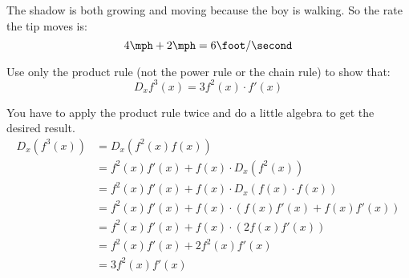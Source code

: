 \documentclass[fleqn,addpoints]{exam}
\begin{document}
\begin{questions}
\begin{solution}[9 cm]
The shadow is both growing and moving because the boy is walking.  So the rate the tip moves is:
\[
  4 \mph + 2 \mph = 6 \foot / \second
\]
\end{solution}

\ifprintanswers
\pagebreak
\fi

\bonusquestion[10] 
Use only the product rule (not the power rule or the chain rule) to show that:
\[
  D_x f^3(x) = 3 f^2(x) \cdot f'(x)
\]

\begin{solution}[8 cm] 
You have to apply the product rule twice and do a little algebra to get the desired result.
\begin{align*}
  D_x(f^3(x)) &= D_x(f^2(x)f(x)) \\
  &= f^2(x) f'(x) + f(x) \cdot D_x(f^2(x)) \\
  &= f^2(x) f'(x) + f(x) \cdot D_x(f(x) \cdot f(x)) \\
  &= f^2(x) f'(x) + f(x) \cdot ( f(x) f'(x) + f(x) f'(x) ) \\
  &= f^2(x) f'(x) + f(x) \cdot \left( 2f(x) f'(x) \right) \\
  &= f^2(x) f'(x) + 2f^2(x) f'(x) \\
  &= 3 f^2(x) f'(x) \\
\end{align*}
\end{solution}








\end{questions}
\end{document}
